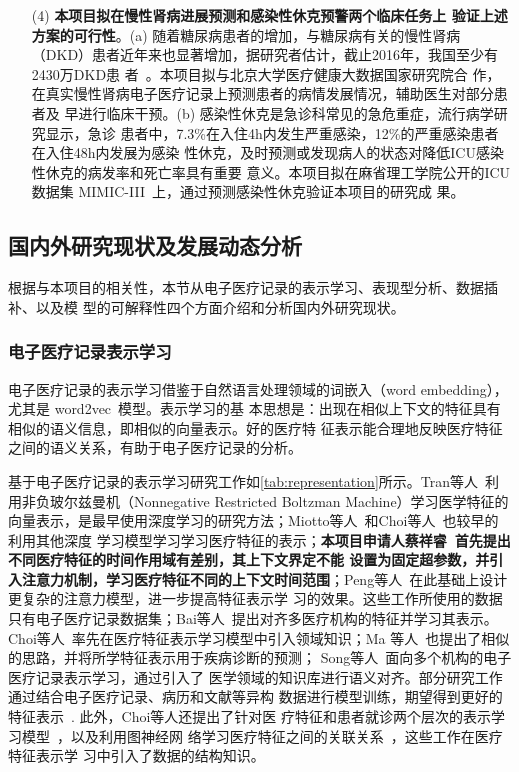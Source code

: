\begin{itemize}
    \item[(4)] \textbf{本项目拟在慢性肾病进展预测和感染性休克预警两个临床任务上
    验证上述方案的可行性}。(a) 随着糖尿病患者的增加，与糖尿病有关的慢性肾病
    （DKD）患者近年来也显著增加，据研究者估计，截止2016年，我国至少有2430万DKD患
    者~。本项目拟与北京大学医疗健康大数据国家研究院合
    作，在真实慢性肾病电子医疗记录上预测患者的病情发展情况，辅助医生对部分患者及
    早进行临床干预。(b) 感染性休克是急诊科常见的急危重症，流行病学研究显示，急诊
    患者中，7.3\%在入住4h内发生严重感染，12\%的严重感染患者在入住48h内发展为感染
    性休克，及时预测或发现病人的状态对降低ICU感染性休克的病发率和死亡率具有重要
    意义。本项目拟在麻省理工学院公开的ICU数据集
    MIMIC-III~上，通过预测感染性休克验证本项目的研究成
    果。
\end{itemize}

\subsection{国内外研究现状及发展动态分析}\label{relatedwork}

根据与本项目的相关性，本节从电子医疗记录的表示学习、表现型分析、数据插补、以及模
型的可解释性四个方面介绍和分析国内外研究现状。

\subsubsection{电子医疗记录表示学习}

电子医疗记录的表示学习借鉴于自然语言处理领域的词嵌入（word embedding），尤其是
word2vec~模型。表示学习的基
本思想是：出现在相似上下文的特征具有相似的语义信息，即相似的向量表示。好的医疗特
征表示能合理地反映医疗特征之间的语义关系，有助于电子医疗记录的分析。

基于电子医疗记录的表示学习研究工作如\cref{tab:representation}所示。Tran等人~利用非负玻尔兹曼机（Nonnegative Restricted Boltzman
Machine）学习医学特征的向量表示，是最早使用深度学习的研究方法；Miotto等人~和Choi等人~也较早的利用其他深度
学习模型学习学习医疗特征的表示；\textbf{本项目申请人蔡祥睿~首先提出不同医疗特征的时间作用域有差别，其上下文界定不能
设置为固定超参数，并引入注意力机制，学习医疗特征不同的上下文时间范围}；Peng等人~在此基础上设计更复杂的注意力模型，进一步提高特征表示学
习的效果。这些工作所使用的数据只有电子医疗记录数据集；Bai等人~提出对齐多医疗机构的特征并学习其表示。Choi等人~率先在医疗特征表示学习模型中引入领域知识；Ma
等人~也提出了相似的思路，并将所学特征表示用于疾病诊断的预测；
Song等人~面向多个机构的电子医疗记录表示学习，通过引入了
医学领域的知识库进行语义对齐。部分研究工作通过结合电子医疗记录、病历和文献等异构
数据进行模型训练，期望得到更好的特征表示~. 此外，Choi等人还提出了针对医
疗特征和患者就诊两个层次的表示学习模型~，以及利用图神经网
络学习医疗特征之间的关联关系~，这些工作在医疗特征表示学
习中引入了数据的结构知识。

